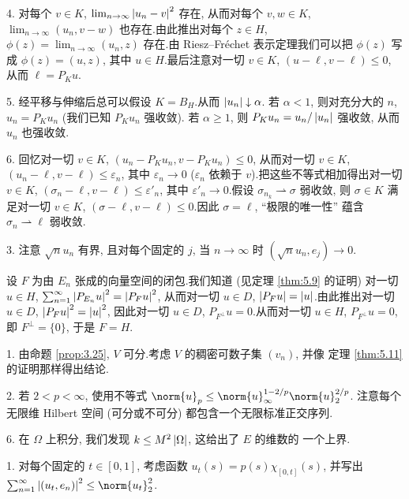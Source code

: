 4. 对每个 $v\in K$, $\lim_{n\to\infty}\left|u_n-v\right|^2$ 存在, 从而对每个
$v,w\in K$, $\lim_{n\to\infty}(u_n,v-w)$ 也存在.由此推出对每个 $z\in H$,
$\phi(z)=\lim_{n\to\infty}(u_n,z)$ 存在.由 Riesz--Fréchet 表示定理我们可以把
$\phi(z)$ 写成 $\phi(z)=(u,z)$, 其中 $u\in H$.最后注意对一切 $v\in K$,
$(u-\ell,v-\ell)\le0$, 从而 $\ell=P_Ku$.

5. 经平移与伸缩后总可以假设 $K=B_H$.从而 $\left|u_n\right|\downarrow\alpha$.
若 $\alpha<1$, 则对充分大的 $n$, $u_n=P_Ku_n$ (我们已知 $P_Ku_n$ 强收敛).
若 $\alpha\ge1$, 则 $P_Ku_n=u_n/\left|u_n\right|$ 强收敛, 从而 $u_n$ 也强收敛.

6. 回忆对一切 $v\in K$, $(u_n-P_Ku_n,v-P_Ku_n)\le0$, 从而对一切 $v\in K$,
$(u_n-\ell,v-\ell)\le\varepsilon_n$, 其中 $\varepsilon_n\to0$ ($\varepsilon_n$
依赖于 $v$).把这些不等式相加得出对一切 $v\in K$,
$(\sigma_n-\ell,v-\ell)\le\varepsilon'_n$, 其中 $\varepsilon'_n\to0$.假设
$\sigma_{n_k}\rightharpoonup\sigma$ 弱收敛, 则 $\sigma\in K$ 满足对一切
$v\in K$, $(\sigma-\ell,v-\ell)\le0$.因此 $\sigma=\ell$, ``极限的唯一性''
蕴含 $\sigma_n\rightharpoonup\ell$ 弱收敛.


3. 注意 $\sqrt{n}u_n$ 有界, 且对每个固定的 $j$, 当 $n\to\infty$ 时
$(\sqrt{n}u_n,e_j)\to0$.


设 $F$ 为由 $E_n$ 张成的向量空间的闭包.我们知道 (见定理  \ref{thm:5.9} 的证明)
对一切 $u\in H$, $\sum_{n=1}^\infty\left|P_{E_n}u\right|^2=\left|P_Fu\right|^2$, 从而对一切
$u\in D$, $\left|P_Fu\right|=\left|u\right|$.由此推出对一切 $u\in D$, $\left|P_Fu\right|^2=\left|u\right|^2$,
因此对一切 $u\in D$, $P_{F^\perp}u=0$.从而对一切 $u\in H$, $P_{F^\perp}u=0$,
即 $F^\perp=\{0\}$, 于是 $F=H$.


1. 由命题  \ref{prop:3.25}, $V$ 可分.考虑 $V$ 的稠密可数子集 $(v_n)$, 并像
定理  \ref{thm:5.11} 的证明那样得出结论.


2. 若 $2<p<\infty$, 使用不等式 $\norm{u}_p\le\norm{u}_\infty^{1-2/p}\norm{u}_2^{2/p}$.
注意每个无限维 Hilbert 空间 (可分或不可分) 都包含一个无限标准正交序列.

6. 在 $\Omega$ 上积分, 我们发现 $k\le M^2\left|\Omega\right|$, 这给出了 $E$ 的维数的
一个上界.


1. 对每个固定的 $t\in[0,1]$, 考虑函数 $u_t(s)=p(s)\chi_{[0,t]}(s)$, 并写出
$\sum_{n=1}^\infty\abs{(u_t,e_n)}^2\le\norm{u_t}_2^2$.

